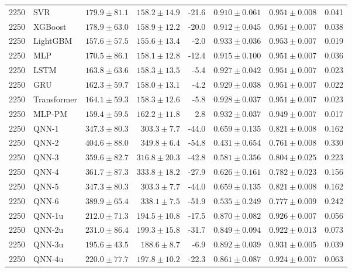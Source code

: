 \begin{longtable}{rlrrrrrr}
2250 & SVR & $179.9 \pm 81.1$ & $158.2 \pm 14.9$ & -21.6 & $0.910 \pm 0.061$ & $0.951 \pm 0.008$ & 0.041 \\
2250 & XGBoost & $178.9 \pm 63.0$ & $158.9 \pm 12.2$ & -20.0 & $0.912 \pm 0.045$ & $0.951 \pm 0.007$ & 0.038 \\
2250 & LightGBM & $157.6 \pm 57.5$ & $155.6 \pm 13.4$ & -2.0 & $0.933 \pm 0.036$ & $0.953 \pm 0.007$ & 0.019 \\
2250 & MLP & $170.5 \pm 86.1$ & $158.1 \pm 12.8$ & -12.4 & $0.915 \pm 0.100$ & $0.951 \pm 0.007$ & 0.036 \\
2250 & LSTM & $163.8 \pm 63.6$ & $158.3 \pm 13.5$ & -5.4 & $0.927 \pm 0.042$ & $0.951 \pm 0.007$ & 0.023 \\
2250 & GRU & $162.3 \pm 59.7$ & $158.0 \pm 13.1$ & -4.2 & $0.929 \pm 0.038$ & $0.951 \pm 0.007$ & 0.022 \\
2250 & Transformer & $164.1 \pm 59.3$ & $158.3 \pm 12.6$ & -5.8 & $0.928 \pm 0.037$ & $0.951 \pm 0.007$ & 0.023 \\
2250 & MLP-PM & $159.4 \pm 59.5$ & $162.2 \pm 11.8$ & 2.8 & $0.932 \pm 0.037$ & $0.949 \pm 0.007$ & 0.017 \\
2250 & QNN-1 & $347.3 \pm 80.3$ & $303.3 \pm 7.7$ & -44.0 & $0.659 \pm 0.135$ & $0.821 \pm 0.008$ & 0.162 \\
2250 & QNN-2 & $404.6 \pm 88.0$ & $349.8 \pm 6.4$ & -54.8 & $0.431 \pm 0.654$ & $0.761 \pm 0.008$ & 0.330 \\
2250 & QNN-3 & $359.6 \pm 82.7$ & $316.8 \pm 20.3$ & -42.8 & $0.581 \pm 0.356$ & $0.804 \pm 0.025$ & 0.223 \\
2250 & QNN-4 & $361.7 \pm 87.3$ & $333.8 \pm 18.2$ & -27.9 & $0.626 \pm 0.161$ & $0.782 \pm 0.023$ & 0.156 \\
2250 & QNN-5 & $347.3 \pm 80.3$ & $303.3 \pm 7.7$ & -44.0 & $0.659 \pm 0.135$ & $0.821 \pm 0.008$ & 0.162 \\
2250 & QNN-6 & $389.9 \pm 65.4$ & $338.1 \pm 7.5$ & -51.9 & $0.535 \pm 0.249$ & $0.777 \pm 0.009$ & 0.242 \\
2250 & QNN-1u & $212.0 \pm 71.3$ & $194.5 \pm 10.8$ & -17.5 & $0.870 \pm 0.082$ & $0.926 \pm 0.007$ & 0.056 \\
2250 & QNN-2u & $231.0 \pm 86.4$ & $199.3 \pm 15.8$ & -31.7 & $0.849 \pm 0.094$ & $0.922 \pm 0.013$ & 0.073 \\
2250 & QNN-3u & $195.6 \pm 43.5$ & $188.6 \pm 8.7$ & -6.9 & $0.892 \pm 0.039$ & $0.931 \pm 0.005$ & 0.039 \\
2250 & QNN-4u & $220.0 \pm 77.7$ & $197.8 \pm 10.2$ & -22.3 & $0.861 \pm 0.087$ & $0.924 \pm 0.007$ & 0.063 \\

\end{longtable}
